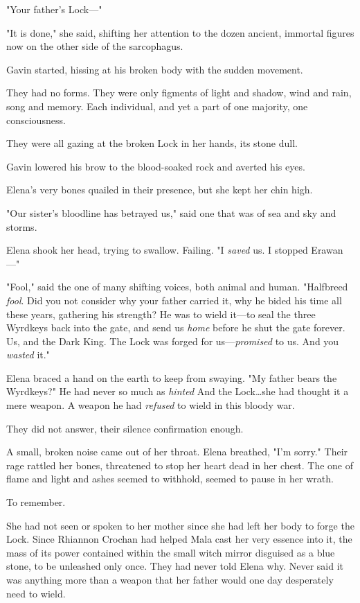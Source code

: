 "Your father's Lock---"

"It is done," she said, shifting her attention to the dozen ancient, immortal figures now on the other side of the sarcophagus.

Gavin started, hissing at his broken body with the sudden movement.

They had no forms.
They were only figments of light and shadow, wind and rain, song and memory.
Each individual, and yet a part of one majority, one consciousness.

They were all gazing at the broken Lock in her hands, its stone dull.

Gavin lowered his brow to the blood-soaked rock and averted his eyes.

Elena's very bones quailed in their presence, but she kept her chin high.

"Our sister's bloodline has betrayed us," said one that was of sea and sky and storms.

Elena shook her head, trying to swallow.
Failing.
"I \emph{saved} us.
I stopped Erawan---"

"Fool," said the one of many shifting voices, both animal and human.
"Halfbreed \emph{fool}.
Did you not consider why your father carried it, why he bided his time all these years, gathering his strength?
He was to wield it---to seal the three Wyrdkeys back into the gate, and send us \emph{home} before he shut the gate forever.
Us, and the Dark King.
The Lock was forged for us---\emph{promised} to us.
And you \emph{wasted} it."

Elena braced a hand on the earth to keep from swaying.
"My father bears the Wyrdkeys?"
He had never so much as \emph{hinted } And the Lock\ldots she had thought it a mere weapon.
A weapon he had \emph{refused} to wield in this bloody war.

They did not answer, their silence confirmation enough.

A small, broken noise came out of her throat.
Elena breathed, "I'm sorry."
Their rage rattled her bones, threatened to stop her heart dead in her chest.
The one of flame and light and ashes seemed to withhold, seemed to pause in her wrath.

To remember.

She had not seen or spoken to her mother since she had left her body to forge the Lock.
Since Rhiannon Crochan had helped Mala cast her very essence into it, the mass of its power contained within the small witch mirror disguised as a blue stone, to be unleashed only once.
They had never told Elena why.
Never said it was anything more than a weapon that her father would one day desperately need to wield.

